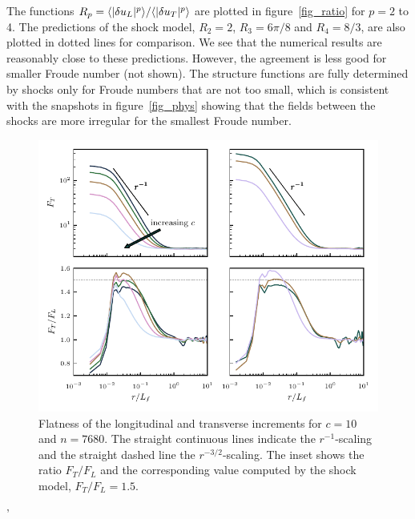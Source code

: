The functions $R_p = \langle |\delta u_L|^p \rangle/\langle |\delta u_T|^p \rangle$ are
plotted in figure~\ref{fig_ratio} for $p =2$ to 4.  The predictions of
the shock model, $R_2 = 2$, $R_3 = 6\pi/8$ and $R_4 = 8/3$, are also
plotted in dotted lines for comparison.  We see that the numerical
results are reasonably close to these predictions.  However, the
agreement is less good for smaller Froude number (not shown).  The
structure functions are fully determined by shocks only for Froude
numbers that are not too small, which is consistent with the snapshots
in figure~\ref{fig_phys} showing that the fields between the shocks
are more irregular for the smallest Froude number.


\begin{figure}
\centerline{\includegraphics[width=12cm]{../Pyfig/fig_flatness}}
\caption{ Flatness of the longitudinal and transverse increments for
$c = 10$ and $n = 7680$. The straight continuous lines indicate the
$r^{-1}$-scaling and the straight dashed line the $r^{-3/2}$-scaling.
The inset shows the ratio $F_T/F_L$ and the corresponding value computed by the shock model, $F_T/F_L = 1.5$.  }
\label{fig_flatness}
\end{figure}'

